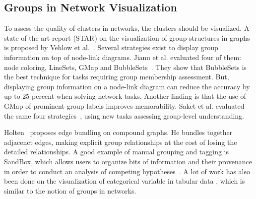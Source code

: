 \subsection{Groups in Network Visualization}

To assess the quality of clusters in networks, the clusters should be visualized.
A state of the art report (STAR) on the visualization of group structures in graphs is proposed by Vehlow et al.~\cite{EVstar.groupstructures15}.
Several strategies exist to display group information on top of node-link diagrams. Jianu et al. evaluated four of them: node coloring, LineSets, GMap and BubbleSets~\cite{jianuHowDisplayGroup2014}. They show that BubbleSets is the best technique for tasks requiring group membership assessment.
But, displaying group information on a node-link diagram can reduce the accuracy by up to 25 percent when solving network tasks.
Another finding is that the use of GMap of prominent group labels improves memorability. Saket et al. evaluated the same four strategies~\cite{Saket14}, using new tasks assessing group-level understanding.

Holten~\cite{holtenHierarchicalEdgeBundles2006} proposes edge bundling on compound graphs. He bundles together adjacenct edges, making explicit group relationships at the cost of losing the detailed relationships.
A good example of manual grouping and tagging is SandBox, which allows users to organize bits of information and their provenance in order to conduct an analysis of competing hypotheses~\cite{wrightSandboxAnalysisConcepts2006}. A lot of work has also been done on the visualization of categorical variable in tabular data \cite{kosaraParallelSetsInteractive2006, gratzlDominoExtractingComparing2014}, which is similar to the notion of groups in networks.


